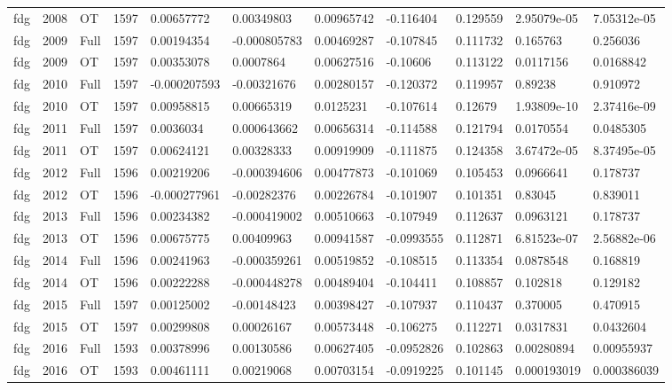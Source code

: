 \begin{landscape}
\begin{longtable}{lllllllllll}
fdg & 2008 & OT & 1597 & 0.00657772 & 0.00349803 & 0.00965742 & -0.116404 & 0.129559 & 2.95079e-05 & 7.05312e-05 \\
fdg & 2009 & Full & 1597 & 0.00194354 & -0.000805783 & 0.00469287 & -0.107845 & 0.111732 & 0.165763 & 0.256036 \\
fdg & 2009 & OT & 1597 & 0.00353078 & 0.0007864 & 0.00627516 & -0.10606 & 0.113122 & 0.0117156 & 0.0168842 \\
fdg & 2010 & Full & 1597 & -0.000207593 & -0.00321676 & 0.00280157 & -0.120372 & 0.119957 & 0.89238 & 0.910972 \\
fdg & 2010 & OT & 1597 & 0.00958815 & 0.00665319 & 0.0125231 & -0.107614 & 0.12679 & 1.93809e-10 & 2.37416e-09 \\
fdg & 2011 & Full & 1597 & 0.0036034 & 0.000643662 & 0.00656314 & -0.114588 & 0.121794 & 0.0170554 & 0.0485305 \\
fdg & 2011 & OT & 1597 & 0.00624121 & 0.00328333 & 0.00919909 & -0.111875 & 0.124358 & 3.67472e-05 & 8.37495e-05 \\
fdg & 2012 & Full & 1596 & 0.00219206 & -0.000394606 & 0.00477873 & -0.101069 & 0.105453 & 0.0966641 & 0.178737 \\
fdg & 2012 & OT & 1596 & -0.000277961 & -0.00282376 & 0.00226784 & -0.101907 & 0.101351 & 0.83045 & 0.839011 \\
fdg & 2013 & Full & 1596 & 0.00234382 & -0.000419002 & 0.00510663 & -0.107949 & 0.112637 & 0.0963121 & 0.178737 \\
fdg & 2013 & OT & 1596 & 0.00675775 & 0.00409963 & 0.00941587 & -0.0993555 & 0.112871 & 6.81523e-07 & 2.56882e-06 \\
fdg & 2014 & Full & 1596 & 0.00241963 & -0.000359261 & 0.00519852 & -0.108515 & 0.113354 & 0.0878548 & 0.168819 \\
fdg & 2014 & OT & 1596 & 0.00222288 & -0.000448278 & 0.00489404 & -0.104411 & 0.108857 & 0.102818 & 0.129182 \\
fdg & 2015 & Full & 1597 & 0.00125002 & -0.00148423 & 0.00398427 & -0.107937 & 0.110437 & 0.370005 & 0.470915 \\
fdg & 2015 & OT & 1597 & 0.00299808 & 0.00026167 & 0.00573448 & -0.106275 & 0.112271 & 0.0317831 & 0.0432604 \\
fdg & 2016 & Full & 1593 & 0.00378996 & 0.00130586 & 0.00627405 & -0.0952826 & 0.102863 & 0.00280894 & 0.00955937 \\
fdg & 2016 & OT & 1593 & 0.00461111 & 0.00219068 & 0.00703154 & -0.0919225 & 0.101145 & 0.000193019 & 0.000386039 \\

\end{longtable}
\end{landscape}
